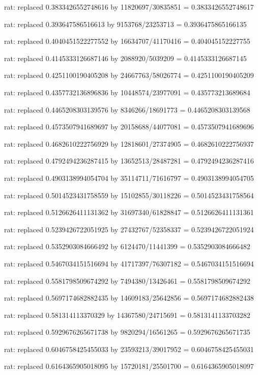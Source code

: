 \documentclass[a4paper,10pt]{article}
\begin{document}
\begin{eulernotebook}
\begin{eulercomment}
\begin{eulercomment}
\begin{eulercomment}
\begin{eulercomment}
\begin{eulercomment}
\begin{eulercomment}
\begin{eulercomment}
\begin{eulercomment}
\begin{eulercomment}
\begin{eulercomment}
\begin{eulercomment}
\begin{eulercomment}
\begin{eulercomment}
\begin{eulercomment}
\begin{eulercomment}
\begin{eulercomment}
\begin{euleroutput}
  rat: replaced 0.3833426552748616 by 11820697/30835851 = 0.3833426552748617
  
  rat: replaced 0.393647586516613 by 9153768/23253713 = 0.3936475865166135
  
  rat: replaced 0.4040451522277552 by 16634707/41170416 = 0.404045152227755
  
  rat: replaced 0.4145333126687146 by 2088920/5039209 = 0.4145333126687145
  
  rat: replaced 0.4251100190405208 by 24667763/58026774 = 0.4251100190405209
  
  rat: replaced 0.4357732136896836 by 10448574/23977091 = 0.435773213689684
  
  rat: replaced 0.4465208303139576 by 8346266/18691773 = 0.4465208303139568
  
  rat: replaced 0.4573507941689697 by 20158688/44077081 = 0.4573507941689696
  
  rat: replaced 0.4682610222756929 by 12818601/27374905 = 0.4682610222756937
  
  rat: replaced 0.4792494236287415 by 13652513/28487281 = 0.4792494236287416
  
  rat: replaced 0.4903138994054704 by 35114711/71616797 = 0.4903138994054705
  
  rat: replaced 0.5014523431758559 by 15102855/30118226 = 0.5014523431758564
  
  rat: replaced 0.5126626411131362 by 31697340/61828847 = 0.5126626411131361
  
  rat: replaced 0.5239426722051925 by 27432767/52358337 = 0.5239426722051924
  
  rat: replaced 0.5352903084666492 by 6124470/11441399 = 0.5352903084666482
  
  rat: replaced 0.5467034151516694 by 41717397/76307182 = 0.5467034151516694
  
  rat: replaced 0.5581798509674292 by 7494380/13426461 = 0.5581798509674292
  
  rat: replaced 0.5697174682882435 by 14609183/25642856 = 0.5697174682882438
  
  rat: replaced 0.581314113370329 by 14367580/24715691 = 0.5813141133703282
  
  rat: replaced 0.5929676265671738 by 9820294/16561265 = 0.5929676265671735
  
  rat: replaced 0.6046758425455033 by 23593213/39017952 = 0.6046758425455031
  
  rat: replaced 0.6164365905018095 by 15720181/25501700 = 0.6164365905018097
  

\end{euleroutput}
\end{eulercomment}
\end{eulercomment}
\end{eulercomment}
\end{eulercomment}
\end{eulercomment}
\end{eulercomment}
\end{eulercomment}
\end{eulercomment}
\end{eulercomment}
\end{eulercomment}
\end{eulercomment}
\end{eulercomment}
\end{eulercomment}
\end{eulercomment}
\end{eulercomment}
\end{eulercomment}
\end{eulernotebook}
\end{document}
